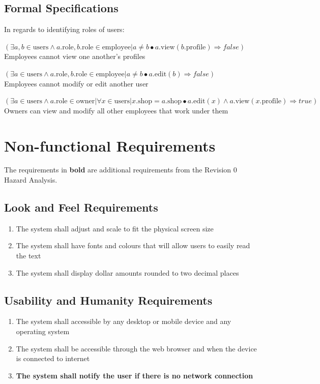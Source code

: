 \documentclass[12pt]{article}
\begin{document}
\subsection{Formal Specifications}
In regards to identifying roles of users:

$(\exists a, b \in \text{users} \wedge a.\text{role},
	b.\text{role} \in \text{employee} | a \neq b \bullet a.\text{view}(b.\text{profile}) \Rightarrow
	false)$\\
Employees cannot view one another's profiles

$(\exists a \in \text{users} \wedge a.\text{role}, b.\text{role} \in \text{employee} | a \neq b \bullet a.\text{edit}(b) \Rightarrow false)$\\
Employees cannot modify or edit another user

$(\exists a \in \text{users} \wedge a.\text{role} \in \text{owner} | \forall x \in \text{users} | x.\text{shop} = a.\text{shop} \bullet a.\text{edit}(x) \wedge a.\text{view}(x.\text{profile}) \Rightarrow true)$\\
Owners can view and modify all other employees that work under them

\section{Non-functional Requirements}
The requirements in \textbf{bold} are additional requirements from the Revision 0 Hazard Analysis.

\subsection{Look and Feel Requirements}
\begin{enumerate}[LF\arabic*.]
	\item The system shall adjust and scale to fit the physical screen size
	\item The system shall have fonts and colours that will allow users to easily read the text
	\item The system shall display dollar amounts rounded to two decimal places
\end{enumerate}

\subsection{Usability and Humanity Requirements}
\begin{enumerate}[UH\arabic*.]
	\item The system shall accessible by any desktop or mobile device and any operating system
	\item The system shall be accessible through the web browser and when the device is connected to internet
	\item \textbf{The system shall notify the user if there is no network connection}
\end{enumerate}
\end{document}
